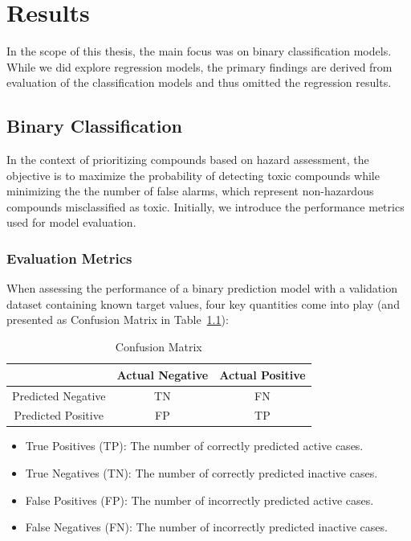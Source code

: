\chapter{Results}\label{chap:results}

In the scope of this thesis, the main focus was on binary classification models. While we did explore regression models, the primary findings are derived from evaluation of the classification models and thus omitted the regression results.

\section{Binary Classification}
In the context of prioritizing compounds based on hazard assessment, the objective is to maximize the probability of detecting toxic compounds while minimizing the the number of false alarms, which represent non-hazardous compounds misclassified as toxic. Initially, we introduce the performance metrics used for model evaluation.

\subsection{Evaluation Metrics}
When assessing the performance of a binary prediction model with a validation dataset containing known target values, four key quantities come into play (and presented as Confusion Matrix in Table~\ref{tab:confusion_matrix}):

\begin{table}[h]
  \centering
  \small
  \caption{Confusion Matrix}
  \label{tab:confusion_matrix}
  \setlength{\tabcolsep}{10pt} %
  \renewcommand{\arraystretch}{1.5} %
  \begin{tabular}{|c|c|c|}
  \cline{2-3}
  \multicolumn{1}{c|}{} & Actual Negative & Actual Positive \\
  \hline
  Predicted Negative & TN & FN \\
  \hline
  Predicted Positive & FP & TP \\
  \hline
  \end{tabular}
\end{table}

\begin{itemize}
  \item True Positives (TP): The number of correctly predicted active cases.
  \item True Negatives (TN): The number of correctly predicted inactive cases.
  \item False Positives (FP): The number of incorrectly predicted active cases.
  \item False Negatives (FN): The number of incorrectly predicted inactive cases.
\end{itemize}

